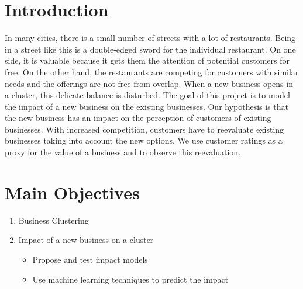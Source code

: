 \documentclass[a0,landscape,beamer]{a0poster}
\begin{document}
\vspace{1cm} %


\begin{multicols}{4} %


\color{SaddleBrown} %

\section*{Introduction}
In many cities, there is a small number of streets with a lot of restaurants. Being in a street like this is a double-edged sword for the individual restaurant. On one side, it is valuable because it gets them the attention of potential customers for free. On the other hand, the restaurants are competing for customers with similar needs and the offerings are not free from overlap. When a new business opens in a cluster, this delicate balance is disturbed. The goal of this project is to model the impact of a new business on the existing businesses.
Our hypothesis is that the new business has an impact on the perception of customers of existing businesses.
With increased competition, customers have to reevaluate existing businesses taking into account the new options.
We use customer ratings as a proxy for the value of a business and to observe this reevaluation.

\color{Navy} %

\section*{Main Objectives}
\begin{enumerate}
\item Business Clustering
\item Impact of a new business on a cluster
	\begin{itemize}
 	 \item Propose and test impact models
 	 \item Use machine learning techniques to predict the impact
  	\end{itemize}
	

\end{enumerate}
\end{multicols}
\end{document}
